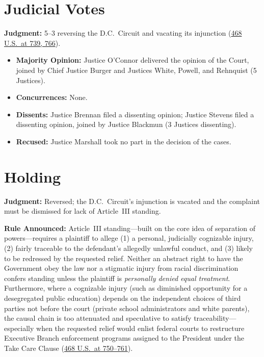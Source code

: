 \documentclass[12pt]{article}
\begin{document}
\section{Judicial Votes}
\textbf{Judgment:} 5--3 reversing the D.C.\ Circuit and vacating its injunction (\href{https://supreme.justia.com/cases/federal/us/468/737/}{468 U.S.\ at 739, 766}).
\begin{itemize}
  \item \textbf{Majority Opinion:} Justice O'Connor delivered the opinion of the Court, joined by Chief Justice Burger and Justices White, Powell, and Rehnquist (5 Justices).
  \item \textbf{Concurrences:} None.
  \item \textbf{Dissents:} Justice Brennan filed a dissenting opinion; Justice Stevens filed a dissenting opinion, joined by Justice Blackmun (3 Justices dissenting).
  \item \textbf{Recused:} Justice Marshall took no part in the decision of the cases.
\end{itemize}

\section{Holding}
\textbf{Judgment:} Reversed; the D.C.\ Circuit's injunction is vacated and the complaint must be dismissed for lack of Article~III standing.

\textbf{Rule Announced:} Article~III standing---built on the core idea of separation of powers---requires a plaintiff to allege (1) a personal, judicially cognizable injury, (2) fairly traceable to the defendant's allegedly unlawful conduct, and (3) likely to be redressed by the requested relief. Neither an abstract right to have the Government obey the law nor a stigmatic injury from racial discrimination confers standing unless the plaintiff is \textit{personally denied equal treatment}. Furthermore, where a cognizable injury (such as diminished opportunity for a desegregated public education) depends on the independent choices of third parties not before the court (private school administrators and white parents), the causal chain is too attenuated and speculative to satisfy traceability---especially when the requested relief would enlist federal courts to restructure Executive Branch enforcement programs assigned to the President under the Take Care Clause (\href{https://supreme.justia.com/cases/federal/us/468/737/}{468 U.S.\ at 750--761}).
\end{document}
